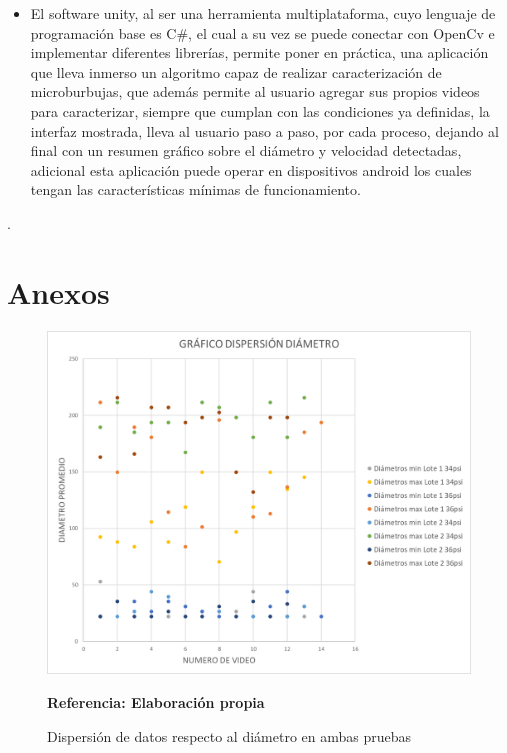 \documentclass[12pt,twocolumn,a4paper]{article}
\begin{document}
\begin{itemize}
\item El software unity, al ser una herramienta multiplataforma, cuyo lenguaje de programación base es C\#, el cual a su vez se puede conectar con OpenCv e implementar diferentes librerías, permite poner en práctica, una aplicación que lleva inmerso un algoritmo capaz de realizar caracterización de microburbujas, que además permite al usuario agregar sus propios videos para caracterizar, siempre que cumplan con las condiciones ya definidas, la interfaz mostrada, lleva al usuario paso a paso, por cada proceso, dejando al final con un resumen gráfico sobre el diámetro y velocidad detectadas, adicional esta aplicación puede operar en dispositivos android los cuales tengan las características mínimas de funcionamiento.
\end{itemize}.




\newpage
\section{Anexos}


\begin{figure}[h!]
	\centering
	\includegraphics[scale=0.6]{dispDia.png}
	\caption{Dispersión de datos respecto al diámetro en ambas pruebas} \textbf{Referencia: Elaboración propia} 
	\label{dispdia}
\end{figure}
 
\end{document}
